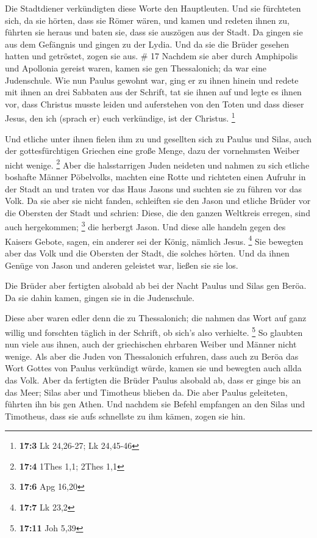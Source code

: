  Die Stadtdiener verkündigten diese Worte den Hauptleuten.
Und sie fürchteten sich, da sie hörten, dass sie Römer wären,
 und kamen und redeten ihnen zu, führten sie heraus und
baten sie, dass sie auszögen aus der Stadt.  Da gingen sie
aus dem Gefängnis und gingen zu der Lydia. Und da sie die Brüder gesehen
hatten und getröstet, zogen sie aus. \# 17  Nachdem sie aber
durch Amphipolis und Apollonia gereist waren, kamen sie gen
Thessalonich; da war eine Judenschule.  Wie nun Paulus
gewohnt war, ging er zu ihnen hinein und redete mit ihnen an drei
Sabbaten aus der Schrift,  tat sie ihnen auf und legte es
ihnen vor, dass Christus musste leiden und auferstehen von den Toten und
dass dieser Jesus, den ich (sprach er) euch verkündige, ist der
Christus. \footnote{\textbf{17:3} Lk 24,26-27; Lk 24,45-46}

 Und etliche unter ihnen fielen ihm zu und gesellten sich zu
Paulus und Silas, auch der gottesfürchtigen Griechen eine große Menge,
dazu der vornehmsten Weiber nicht wenige. \footnote{\textbf{17:4} 1Thes
  1,1; 2Thes 1,1}  Aber die halsstarrigen Juden neideten und
nahmen zu sich etliche boshafte Männer Pöbelvolks, machten eine Rotte
und richteten einen Aufruhr in der Stadt an und traten vor das Haus
Jasons und suchten sie zu führen vor das Volk.  Da sie aber
sie nicht fanden, schleiften sie den Jason und etliche Brüder vor die
Obersten der Stadt und schrien: Diese, die den ganzen Weltkreis erregen,
sind auch hergekommen; \footnote{\textbf{17:6} Apg 16,20} 
die herbergt Jason. Und diese alle handeln gegen des Kaisers Gebote,
sagen, ein anderer sei der König, nämlich Jesus. \footnote{\textbf{17:7}
  Lk 23,2}  Sie bewegten aber das Volk und die Obersten der
Stadt, die solches hörten.  Und da ihnen Genüge von Jason
und anderen geleistet war, ließen sie sie los.

 Die Brüder aber fertigten alsobald ab bei der Nacht Paulus
und Silas gen Beröa. Da sie dahin kamen, gingen sie in die Judenschule.

 Diese aber waren edler denn die zu Thessalonich; die
nahmen das Wort auf ganz willig und forschten täglich in der Schrift, ob
sich's also verhielte. \footnote{\textbf{17:11} Joh 5,39} 
So glaubten nun viele aus ihnen, auch der griechischen ehrbaren Weiber
und Männer nicht wenige.  Als aber die Juden von
Thessalonich erfuhren, dass auch zu Beröa das Wort Gottes von Paulus
verkündigt würde, kamen sie und bewegten auch allda das Volk.
 Aber da fertigten die Brüder Paulus alsobald ab, dass er
ginge bis an das Meer; Silas aber und Timotheus blieben da.
 Die aber Paulus geleiteten, führten ihn bis gen Athen. Und
nachdem sie Befehl empfangen an den Silas und Timotheus, dass sie aufs
schnellste zu ihm kämen, zogen sie hin.


